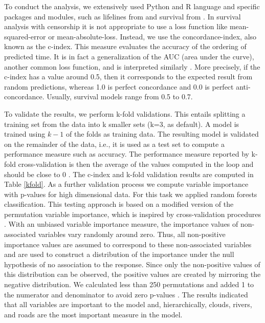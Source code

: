 To conduct the analysis, we extensively used Python and R language and specific packages and modules, such as lifelines from \citet{cameron_2018} and survival from \citet{survival-book,survival-package}. In survival analysis with censorship it is not appropriate to use a loss function like mean-squared-error or mean-absolute-loss. Instead, we use the concordance-index, also known as the c-index. This measure evaluates the accuracy of the ordering of predicted time. It is in fact a generalization of the AUC (area under the curve), another common loss function, and is interpreted similarly \citep{cameron_2018}. More precisely, if the c-index has a value around 0.5, then it corresponds to the expected result from random predictions, whereas 1.0 is perfect concordance and 0.0 is perfect anti-concordance. Usually, survival models range from 0.5 to 0.7.

To validate the results, we perform k-fold validations. This entails splitting a training set from the data into k smaller sets (k=3, as default). A model is trained using $k-1$ of the folds as training data. The resulting model is validated on the remainder of the data, i.e., it is used as a test set to compute a performance measure such as accuracy. The performance measure reported by k-fold cross-validation is then the average of the values computed in the loop and should be close to 0 \citep{scikit-learn}. The c-index and k-fold validation results are computed in Table \ref{kfold}. As a further validation process we compute variable importance with p-values for high dimensional data. For this task we applied random forests classification. This testing approach is based on a modified version of the permutation variable importance, which is inspired by cross-validation procedures \citep{Janitza2016}. With an unbiased variable importance measure, the importance values of non-associated variables vary randomly around zero. Thus, all non-positive importance values are assumed to correspond to these non-associated variables and are used to construct a distribution of the importance under the null hypothesis of no association to the response. Since only the non-positive values of this distribution can be observed, the positive values are created by mirroring the negative distribution. We calculated less than 250 permutations and added 1 to the numerator and denominator to avoid zero p-values \citep{ranger_2018}. The results indicated that all variables are important to the model and, hierarchically, clouds, rivers, and roads are the most important measure in the model.

